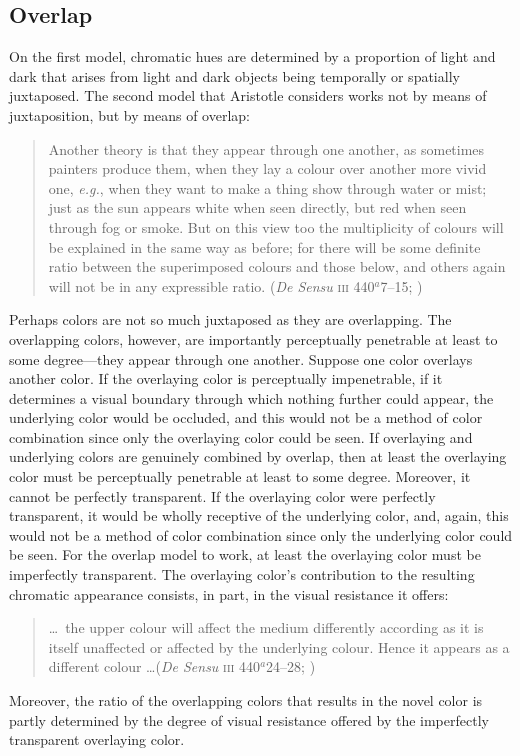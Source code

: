 \subsection{Overlap} %
\label{sub:overlap}
On the first model, chromatic hues are determined by a proportion of light and dark that arises from light and dark objects being temporally or spatially juxtaposed. The second model that Aristotle considers works not by means of juxtaposition, but by means of overlap:
\begin{quote}
	Another theory is that they appear through one another, as sometimes painters produce them, when they lay a colour over another more vivid one, \emph{e.g.}, when they want to make a thing show through water or mist; just as the sun appears white when seen directly, but red when seen through fog or smoke. But on this view too the multiplicity of colours will be explained in the same way as before; for there will be some definite ratio between the superimposed colours and those below, and others again will not be in any expressible ratio. (\emph{De Sensu} \textsc{iii} 440\( ^{a} \)7--15; \citealt[235]{Hett:1936fk})
\end{quote}
Perhaps colors are not so much juxtaposed as they are overlapping. The overlapping colors, however, are importantly perceptually penetrable at least to some degree---they appear through one another. Suppose one color overlays another color. If the overlaying color is perceptually impenetrable, if it determines a visual boundary through which nothing further could appear, the underlying color would be occluded, and this would not be a method of color combination since only the overlaying color could be seen. If overlaying and underlying colors are genuinely combined by overlap, then at least the overlaying color must be perceptually penetrable at least to some degree. Moreover, it cannot be perfectly transparent. If the overlaying color were perfectly transparent, it would be wholly receptive of the underlying color, and, again, this would not be a method of color combination since only the underlying color could be seen. For the overlap model to work, at least the overlaying color must be imperfectly transparent. The overlaying color's contribution to the resulting chromatic appearance consists, in part, in the visual resistance it offers:
\begin{quote}
	\ldots\ the upper colour will affect the medium differently according as it is itself unaffected or affected by the underlying colour. Hence it appears as a different colour \ldots (\emph{De Sensu} \textsc{iii} 440\( ^{a} \)24--28; \citealt[235]{Hett:1936fk})
\end{quote}
Moreover, the ratio of the overlapping colors that results in the novel color is partly determined by the degree of visual resistance offered by the imperfectly transparent overlaying color.

